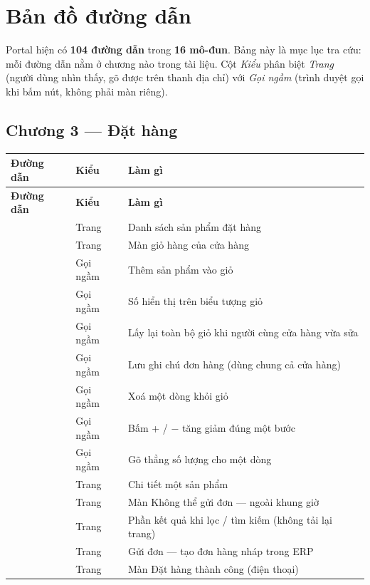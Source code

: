 \chapter{Bản đồ đường dẫn}

Portal hiện có \textbf{104 đường dẫn} trong \textbf{16 mô-đun}. Bảng này là mục lục tra cứu: mỗi đường dẫn nằm ở chương nào trong tài liệu. Cột \emph{Kiểu} phân biệt \emph{Trang} (người dùng nhìn thấy, gõ được trên thanh địa chỉ) với \emph{Gọi ngầm} (trình duyệt gọi khi bấm nút, không phải màn riêng).

\section{Chương 3 --- Đặt hàng}
\footnotesize
\begin{longtable}{L{7.0cm}L{1.8cm}L{6.0cm}}
\textbf{Đường dẫn} & \textbf{Kiểu} & \textbf{Làm gì}\\ \midrule
\endfirsthead
{}\textbf{Đường dẫn} & \textbf{Kiểu} & \textbf{Làm gì}\\ \midrule
\endhead
{} & Trang & Danh sách sản phẩm đặt hàng\\
 & Trang & Màn giỏ hàng của cửa hàng\\
 & Gọi ngầm & Thêm sản phẩm vào giỏ\\
 & Gọi ngầm & Số hiển thị trên biểu tượng giỏ\\
 & Gọi ngầm & Lấy lại toàn bộ giỏ khi người cùng cửa hàng vừa sửa\\
 & Gọi ngầm & Lưu ghi chú đơn hàng (dùng chung cả cửa hàng)\\
 & Gọi ngầm & Xoá một dòng khỏi giỏ\\
 & Gọi ngầm & Bấm + / − tăng giảm đúng một bước\\
 & Gọi ngầm & Gõ thẳng số lượng cho một dòng\\
 & Trang & Chi tiết một sản phẩm\\
 & Trang & Màn Không thể gửi đơn — ngoài khung giờ\\
 & Trang & Phần kết quả khi lọc / tìm kiếm (không tải lại trang)\\
 & Trang & Gửi đơn — tạo đơn hàng nháp trong ERP\\
 & Trang & Màn Đặt hàng thành công (điện thoại)\\
\end{longtable}
\normalsize

